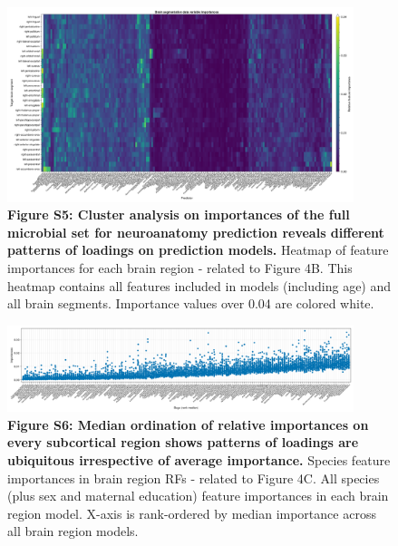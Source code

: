 \documentclass{article}
\begin{document}
\begin{figure}[h]
  \centering
  \includegraphics[width=0.9\textwidth]{assets/Supp_Figure5.png}
  \captionsetup{labelformat=empty}
  \caption{
      \textbf{Figure S5: Cluster analysis on importances of the full microbial set for neuroanatomy prediction reveals different patterns of loadings on prediction models.}
      Heatmap of feature importances for each brain region -
      related to Figure 4B. This heatmap contains all features included in models
      (including age) and all brain segments. Importance values over 0.04
      are colored white.
  }
\end{figure}

\begin{figure}
  \centering
  \includegraphics[width=0.9\textwidth]{assets/Supp_Figure6.png}
  \captionsetup{labelformat=empty}
  \caption{
      \textbf{Figure S6: Median ordination of relative importances on every subcortical region shows patterns of loadings are ubiquitous irrespective of average importance.}
      Species feature importances in brain region RFs - related to Figure 4C.
      All species (plus sex and maternal education) feature importances in each brain region model.
      X-axis is rank-ordered by median importance across all brain region models.
  }
\end{figure}
\end{document}
